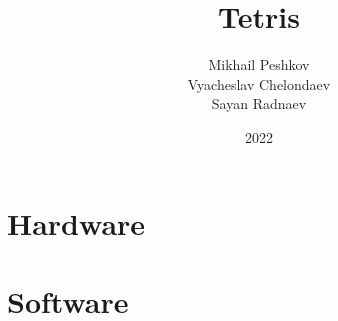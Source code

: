 \documentclass[14 pt, a4paper, leqno, oneside]{extreport}
\title{Tetris}
\author{Mikhail Peshkov \\ Vyacheslav Chelondaev \\ Sayan Radnaev}
\date{2022}
\begin{document}
	
	\maketitle
	\newpage
	\tableofcontents
	\newpage
	
	\chapter{Hardware}
	
	
	\chapter{Software}
	
\end{document}
